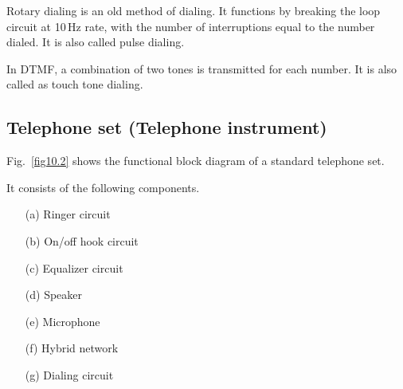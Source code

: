 Rotary dialing is an old method of dialing. It functions by breaking the loop circuit at 10\,Hz rate, with the number of interruptions equal to the number dialed. It is also called pulse dialing.

In DTMF, a combination of two tones is transmitted for each number. It is also called as touch tone dialing.

\subsection{Telephone set (Telephone instrument)}\label{sec10.2.3}

Fig.~\ref{fig10.2} shows the functional block diagram of a standard telephone set.

It consists of the following components.
\begin{itemize}
\item[(a)] Ringer circuit

\item[(b)] On/off hook circuit

\item[(c)] Equalizer circuit

\item[(d)] Speaker

\item[(e)] Microphone

\item[(f)] Hybrid network

\item[(g)] Dialing circuit
\end{itemize}


